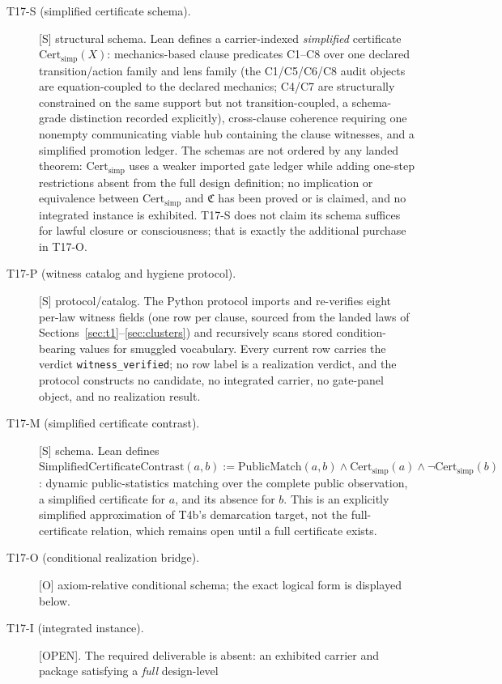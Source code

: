 \documentclass[11pt]{article}
\newcommand{\gradeS}{\textsf{[S]}}
\newcommand{\gradeO}{\textsf{[O]}}
\newcommand{\gradeOpen}{\textsf{[OPEN]}}
\newcommand{\Cpkg}{\mathfrak{C}}
\newcommand{\Certsimp}{\mathrm{Cert}_{\mathrm{simp}}}
\theoremstyle{definition}
\begin{document}
\begin{description}
\item[T17-S (simplified certificate schema).] \gradeS{} structural schema.
Lean defines a carrier-indexed \emph{simplified} certificate
$\Certsimp(X)$: mechanics-based clause predicates C1--C8 over one declared
transition/action family and lens family (the C1/C5/C6/C8 audit objects are
equation-coupled to the declared mechanics; C4/C7 are structurally
constrained on the same support but not transition-coupled, a schema-grade
distinction recorded explicitly), cross-clause coherence requiring one
nonempty communicating viable hub containing the clause witnesses, and a
simplified promotion ledger. The schemas are not ordered by any landed
theorem: $\Certsimp$ uses a weaker imported gate ledger while adding one-step
restrictions absent from the full design definition; no implication or
equivalence between $\Certsimp$ and $\Cpkg$ has been proved or is claimed,
and no integrated instance is exhibited. T17-S does not claim its schema
suffices for lawful closure or consciousness; that is exactly the
additional purchase in T17-O.
\item[T17-P (witness catalog and hygiene protocol).] \gradeS{}
protocol/catalog. The Python protocol imports and re-verifies eight per-law
witness fields (one row per clause, sourced from the landed laws of
Sections~\ref{sec:t1}--\ref{sec:clusters}) and recursively scans stored
condition-bearing values for smuggled vocabulary. Every current row carries
the verdict \texttt{witness\_verified}; no row label is a realization
verdict, and the protocol constructs no candidate, no integrated carrier, no
gate-panel object, and no realization result.
\item[T17-M (simplified certificate contrast).] \gradeS{} schema. Lean
defines $\mathrm{SimplifiedCertificateContrast}(a,b) :=
\mathrm{PublicMatch}(a,b) \wedge \Certsimp(a) \wedge \neg\Certsimp(b)$:
dynamic public-statistics matching over the complete public observation, a
simplified certificate for $a$, and its absence for $b$. This is an
explicitly simplified approximation of T4b's demarcation target, not the
full-certificate relation, which remains open until a full certificate
exists.
\item[T17-O (conditional realization bridge).] \gradeO{} axiom-relative
conditional schema; the exact logical form is displayed below.
\item[T17-I (integrated instance).] \gradeOpen. The required deliverable is
absent: an exhibited carrier and package satisfying a \emph{full} design-level

\end{description}
\end{document}
